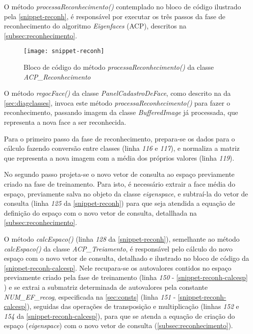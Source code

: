O método \textit{processaReconhecimento()} contemplado no bloco de código ilustrado pela \autoref{snippet-reconh}, é responsável por executar os três passos da fase de reconhecimento do algoritmo \textit{Eigenfaces} (ACP), descritos na \autoref{subsec:reconhecimento}.

\begin{figure}[h]
	\centering
	\texttt{[image: snippet-reconh]}
	\caption{Bloco de código do método \textit{processaReconhecimento()} da classe \textit{ACP\_Reconhecimento}}
	\label{snippet-reconh}
\end{figure}


O método \textit{regocFace()} da classe \textit{PanelCadastroDeFace}, como descrito na da \autoref{sec:diagclasses}, invoca este método \textit{processaReconhecimento()} para fazer o reconhecimento, passando imagem da classe \textit{BufferedImage} já processada, que representa a nova face a ser reconhecida. 

Para o primeiro passo da fase de reconhecimento, prepara-se os dados para o cálculo fazendo conversão entre classes (linha \textit{116} e \textit{117}), e normaliza a matriz que representa a nova imagem com a média dos próprios valores (linha \textit{119}).

No segundo passo projeta-se o novo vetor de consulta ao espaço previamente criado na fase de treinamento. Para isto, é necessário extrair a face média do espaço, previamente salva no objeto da classe \textit{eigenspace}, e subtraí-la do vetor de consulta (linha \textit{125} da \autoref{snippet-reconh}) para que seja atendida a equação de definição do espaço com o novo vetor de consulta, detallhada  na \autoref{subsec:reconhecimento}. 

O método \textit{calcEspaco()} (linha \textit{128} da \autoref{snippet-reconh}), semelhante ao método \textit{calcEspaco()} da classe \textit{ACP\_Treiamento}, é responsável pelo cálculo do novo espaço com o novo vetor de consulta, detalhado e ilustrado no bloco de código da \autoref{snippet-reconh-calcesp}. Nele recupara-se os autovalores contidos no espaço previamente criado pela fase de treinamento (linha \textit{150} - \autoref{snippet-reconh-calcesp} ) e se extrai a submatriz determinada de autovalores pela constante \textit{NUM\_EF\_recog}, especificada na \autoref{sec:consts} (linha \textit{151} - \autoref{snippet-reconh-calcesp}), seguidas das operações de transposição e multiplicação (linhas \textit{152} e \textit{154} da \autoref{snippet-reconh-calcesp}), para que se atenda a equação de criação do espaço (\textit{eigenspace}) com o novo vetor de consulta (\autoref{subsec:reconhecimento}).

